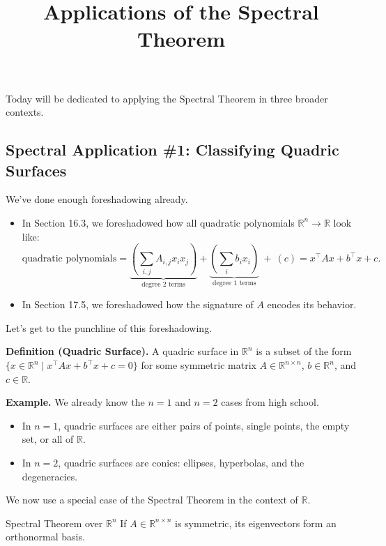 \title{Applications of the Spectral Theorem}



Today will be dedicated to applying the Spectral Theorem in three broader contexts.

\subsection{Spectral Application \#1: Classifying Quadric Surfaces}

We've done enough foreshadowing already.
\begin{itemize}
    \item In Section 16.3, we foreshadowed how all quadratic polynomials $\mathbb{R}^n \to \mathbb{R}$ look like:
\[ \text{quadratic polynomials} = \underbrace{\left(\sum_{i, j} A_{i, j} x_i x_j\right)}_{\text{degree 2 terms}} + \underbrace{\left(\sum_{i} b_i x_i \right)}_{\text{degree 1 terms}} \ + \ \left(c\right) = x^{\top}Ax + b^{\top}x + c. \]
    \item In Section 17.5, we foreshadowed how the signature of $A$ encodes its behavior.
\end{itemize}
Let's get to the punchline of this foreshadowing.

\textbf{Definition (Quadric Surface).} A quadric surface in $\mathbb{R}^n$ is a subset of the form $\{x \in \mathbb{R}^n \mid x^{\top}Ax + b^{\top}x + c = 0 \}$ for some symmetric matrix $A \in \mathbb{R}^{n \times n}$, $b \in \mathbb{R}^n$, and $c \in \mathbb{R}$.

\textbf{Example.} We already know the $n = 1$ and $n = 2$ cases from high school.
\begin{itemize}
    \item In $n = 1$, quadric surfaces are either pairs of points, single points, the empty set, or all of $\mathbb{R}$.
    \item In $n = 2$, quadric surfaces are conics: ellipses, hyperbolas, and the degeneracies.
\end{itemize}
We now use a special case of the Spectral Theorem in the context of $\mathbb{R}$.

\begin{theorem}{Spectral Theorem over $\mathbb{R}^n$}
    If $A \in \mathbb{R}^{n \times n}$ is symmetric, its eigenvectors form an orthonormal basis.
\end{theorem}

